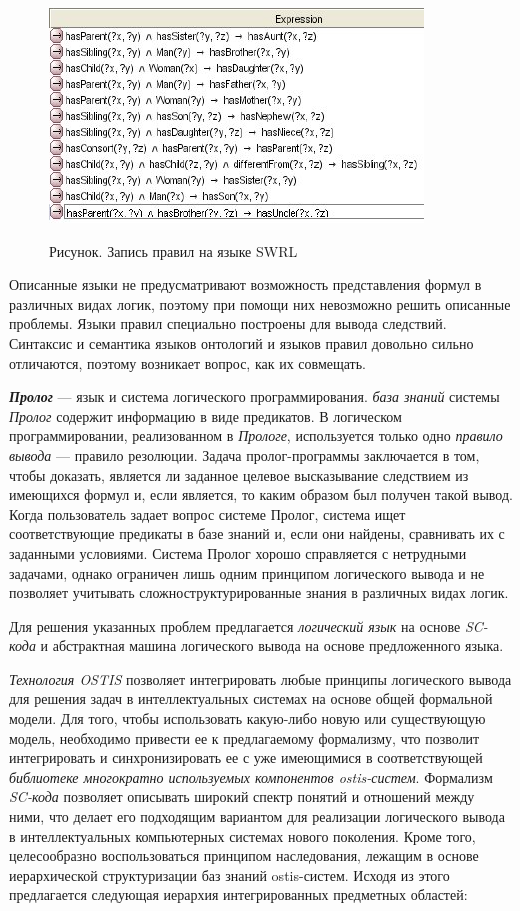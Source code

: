 \begin{figure}[H]
	\caption{Рисунок. Запись правил на языке SWRL}
	\includegraphics[scale=0.8]{author/part3/figures/swrl_example.png}
	\label{fig:swrl_example}
\end{figure}

Описанные языки не предусматривают возможность представления формул в различных видах логик, поэтому при помощи них невозможно решить описанные проблемы. Языки правил специально построены для вывода следствий. Синтаксис и семантика языков онтологий и языков правил довольно сильно отличаются, поэтому возникает вопрос, как их совмещать. 

\textbf{\textit{Пролог}} --- язык и система логического программирования. \textit{база знаний} системы \textit{Пролог} содержит информацию в виде предикатов. В логическом программировании, реализованном в \textit{Прологе}, используется только одно \textit{правило вывода} --- правило резолюции. Задача пролог-программы заключается в том, чтобы доказать, является ли заданное целевое высказывание следствием из имеющихся формул и, если является, то каким образом был получен такой вывод. Когда пользователь задает вопрос системе Пролог, система ищет соответствующие предикаты в базе знаний и, если они найдены, сравнивать их с заданными условиями. Система Пролог хорошо справляется с нетрудными задачами, однако ограничен лишь одним принципом логического вывода и не позволяет учитывать сложноструктурированные знания в различных видах логик.

Для решения указанных проблем предлагается \textit{логический язык} на основе \textit{SC-кода} и абстрактная машина логического вывода на основе предложенного языка. 

\textit{Технология OSTIS} позволяет интегрировать любые принципы логического вывода для решения задач в интеллектуальных системах на основе общей формальной модели. Для того, чтобы использовать какую-либо новую или существующую модель, необходимо привести ее к предлагаемому формализму, что позволит интегрировать и синхронизировать ее с уже имеющимися в соответствующей \textit{библиотеке многократно используемых компонентов ostis-систем}. Формализм \textit{SC-кода} позволяет описывать широкий спектр понятий и отношений между ними, что делает его подходящим вариантом для реализации логического вывода в интеллектуальных компьютерных системах нового поколения. Кроме того, целесообразно воспользоваться принципом наследования, лежащим в основе иерархической структуризации баз знаний ostis-систем. Исходя из этого предлагается следующая иерархия интегрированных предметных областей:


